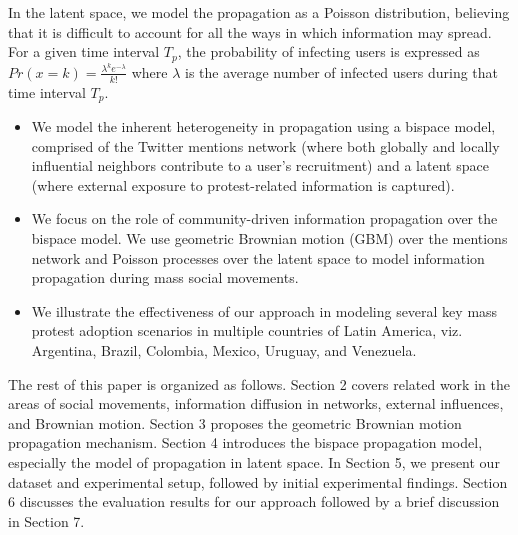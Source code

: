 In the latent space, we model the propagation as a Poisson distribution, believing that it is difficult to account for all the ways in which information may spread. For a given time interval $T_p$, the probability of infecting users is expressed as $Pr(x=k)=\frac{\lambda^k e^{-\lambda}}{k!}$ where $\lambda$ is the average number of infected users during that time interval $T_p$.
\vspace{2 mm}
\fi

\begin{itemize}
\item
We model the inherent heterogeneity in propagation using a
bispace model, comprised of the Twitter mentions network (where
both globally and locally influential neighbors contribute to a user's
recruitment) and a
latent space (where external exposure to protest-related information is
captured).
\item We focus on the role of community-driven information propagation
over the bispace model. We use geometric Brownian motion (GBM)
over the mentions network and Poisson processes over the latent space to model information propagation during mass social movements.
\item We illustrate the effectiveness of our approach in modeling several key mass protest adoption scenarios in multiple countries of Latin America, viz.
Argentina, Brazil,
Colombia,
Mexico,
Uruguay, and
Venezuela.

\end{itemize}

The rest of this paper is organized as follows. Section 2 covers related work in the areas of social movements, information diffusion in networks, external influences, and Brownian motion. Section 3 proposes the geometric Brownian motion propagation mechanism. Section 4 introduces the bispace propagation model, especially the model of propagation in latent space. In Section 5, we
present our dataset and experimental setup,
followed by initial experimental findings. Section 6 discusses the
evaluation results for our approach followed by a brief discussion in
Section 7.
